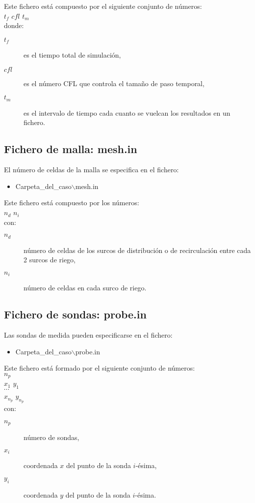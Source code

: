 Este fichero está compuesto por el siguiente conjunto de números:\\
$t_f$ $cfl$ $t_m$\\
donde:
\begin{description}
\item[$t_f$] es el tiempo total de simulación,
\item[$cfl$] es el número CFL que controla el tamaño de paso temporal,
\item[$t_m$] es el intervalo de tiempo cada cuanto se vuelcan los resultados en
	un fichero.
\end{description}

\subsection{Fichero de malla: mesh.in}

El número de celdas de la malla se especifica en el fichero:
\begin{itemize}
\item Carpeta\_del\_caso$\backslash$mesh.in
\end{itemize}

Este fichero está compuesto por los números:\\
$n_d$ $n_i$\\
con:
\begin{description}
\item[$n_d$] número de celdas de los surcos de distribución o de recirculación
	entre cada 2 surcos de riego,
\item[$n_i$] número de celdas en cada surco de riego.
\end{description}

\subsection{Fichero de sondas: probe.in}

Las sondas de medida pueden especificarse en el fichero:
\begin{itemize}
\item Carpeta\_del\_caso$\backslash$probe.in
\end{itemize}

Este fichero está formado por el siguiente conjunto de números:\\
$n_p$\\
$x_1$ $y_1$\\
$\cdots$\\
$x_{n_p}$ $y_{n_p}$\\
con:
\begin{description}
\item[$n_p$] número de sondas,
\item[$x_i$] coordenada $x$ del punto de la sonda $i$-ésima,
\item[$y_i$] coordenada $y$ del punto de la sonda $i$-ésima.
\end{description}

